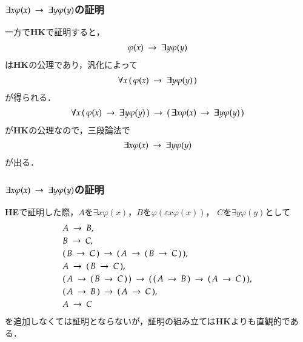 \documentclass[dvipdfmx,10pt,notheorems]{beamer}
\theoremstyle{definition}
\newcommand{\rarrow}{\hspace{0.25em}\rightarrow\hspace{0.25em}} %
\begin{document}
\begin{frame}\frametitle{$\exists x \varphi(x) \rarrow \exists y \varphi(y)$の証明}
	一方で{\bf HK}で証明すると，
	\begin{align}
		\varphi(x) \rarrow \exists y \varphi(y)
	\end{align}
	は{\bf HK}の公理であり，汎化によって
	\begin{align}
		\forall x\, (\, \varphi(x) \rarrow \exists y \varphi(y)\, )
	\end{align}
	が得られる．
	\begin{align}
		\forall x\, (\, \varphi(x) \rarrow \exists y \varphi(y)\, ) \rarrow 
		(\, \exists x \varphi(x) \rarrow \exists y \varphi(y)\, )
	\end{align}
	が{\bf HK}の公理なので，三段論法で
	\begin{align}
		\exists x \varphi(x) \rarrow \exists y \varphi(y)
	\end{align}
	が出る．
\end{frame}

\begin{frame}\frametitle{$\exists x \varphi(x) \rarrow \exists y \varphi(y)$の証明}
	{\bf HE}で証明した際，$A$を$\exists x \varphi(x)$，$B$を$\varphi(\varepsilon x \varphi(x))$， 
	$C$を$\exists y \varphi(y)$として
	\begin{align}
		&A \rarrow B, \\
		&B \rarrow C, \\
		&(\, B \rarrow C\, ) \rarrow (\, A \rarrow (\, B \rarrow C\, )\, ), \\
		&A \rarrow (\, B \rarrow C\, ), \\
		&(\, A \rarrow (\, B \rarrow C\, )\, ) \rarrow (\, (\, A \rarrow B\, ) \rarrow (\, A \rarrow C\, )\, ), \\
		&(\, A \rarrow B\, ) \rarrow (\, A \rarrow C\, ), \\
		&A \rarrow C
	\end{align}
	を追加しなくては証明とならないが，証明の組み立ては{\bf HK}よりも直観的である．
\end{frame}
\end{document}
